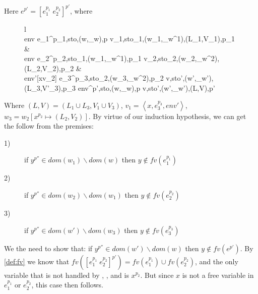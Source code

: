 \item[\runa{App}] Here $e^{p'}=[e_1^{p_1}\;e_2^{p_2}]^{p'}$, where
\begin{figure}[H]
	\setlength\tabcolsep{8pt}
	\begin{tabular}{l}
		\InfName{App}\\[0.2cm]
		\inference[]
			{env \vdash \left\langle e_1^{p_1},sto,(w,\sqsubseteq_w),p \right\rangle \rightarrow \left\langle v_1,sto_1,(w_1,\sqsubseteq_w^1),(L_1,V_1),p_1 \right\rangle &\\
			env \vdash \left\langle e_2^{p_2},sto_1,(w_1,\sqsubseteq_w^1),p_1 \right\rangle \rightarrow \left\langle v_2,sto_2,(w_2,\sqsubseteq_w^2),(L_2,V_2),p_2 \right\rangle &\\
			env'[x\mapsto v_2] \vdash \left\langle e_3^{p_3},sto_2,(w_3,\sqsubseteq_w^2),p_2 \right\rangle \rightarrow \left\langle v,sto',(w',\sqsubseteq_w'),(L_3,V'_3),p_3 \right\rangle}
			{env\vdash \left\langle \left[e_1^{p_1}\;e_2^{p_2}\right]^{p'},sto,(w,\sqsubseteq_w),p \right\rangle \rightarrow \left\langle v,sto',(w',\sqsubseteq_w'),(L,V),p' \right\rangle}
	\end{tabular}
\end{figure}
Where $(L,V)=(L_1\cup L_3,V_1\cup V_3)$, $v_1=\left\langle x,e_3^{p_3},env'\right\rangle$, $w_3=w_2[x^{p_2}\mapsto (L_2,V_2)]$.
By virtue of our induction hypothesis, we can get the follow from the premises:
\begin{description}
	\item[1)] if $y^{p''}\in dom(w_1)\backslash dom(w)$ then $y\notin fv(e_1^{p_1})$
	\item[2)] if $y^{p''}\in dom(w_2)\backslash dom(w_1)$ then $y\notin fv(e_2^{p_2})$
	\item[3)] if $y^{p''}\in dom(w')\backslash dom(w_3)$ then $y\notin fv(e_3^{p_3})$
\end{description}
We the need to show that: if $y^{p''}\in dom(w')\backslash dom(w)$ then $y\notin fv(e^{p'})$.
By \cref{def:fv} we know that $fv([e_1^{p_1}\;e_2^{p_2}]^{p'})=fv(e_1^{p_1})\cup fv(e_2^{p_2})$, and the only variable that is not handled by , , and  is $x^{p_2}$.
But since $x$ is not a free variable in $e_1^{p_1}$ or $e_2^{p_2}$, this case then follows.
